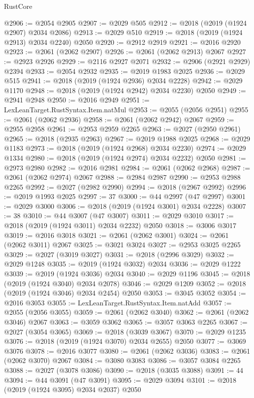 \begin{lexlean}{RustCore}
\begin{coremodule}
@2906 := @2054 @2905
@2907 := @2029 @505
@2912 := @2018 (@2019 (@1924 @2907) @2034 @2086)
@2913 := @2029 @510
@2919 := @2018 (@2019 (@1924 @2913) @2034 @2240) @2050
@2920 := @2912 @2919
@2921 := @2016 @2920
@2923 := @2061 (@2062 @2907)
@2926 := @2061 (@2062 @2913) @2067
@2927 := @2923 @2926
@2929 := @2116 @2927 @2071
@2932 := @2906 (@2921 @2929) @2394
@2933 := @2054 @2932
@2935 := @2019 @1983 @2025
@2936 := @2029 @515
@2941 := @2018 (@2019 (@1924 @2936) @2034 @2228)
@2942 := @2029 @1170
@2948 := @2018 (@2019 (@1924 @2942) @2034 @2230) @2050
@2949 := @2941 @2948
@2950 := @2016 @2949
@2951 := LexLeanTarget.RustSyntax.Item.natMul
@2953 := @2055 (@2056 @2951)
@2955 := @2061 (@2062 @2936)
@2958 := @2061 (@2062 @2942) @2067
@2959 := @2955 @2958
@2961 := @2953 @2959 @2265
@2963 := @2027 (@2950 @2961)
@2965 := @2018 (@2935 @2963)
@2967 := @2019 @1988 @2025
@2968 := @2029 @1183
@2973 := @2018 (@2019 (@1924 @2968) @2034 @2230)
@2974 := @2029 @1334
@2980 := @2018 (@2019 (@1924 @2974) @2034 @2232) @2050
@2981 := @2973 @2980
@2982 := @2016 @2981
@2984 := @2061 (@2062 @2968)
@2987 := @2061 (@2062 @2974) @2067
@2988 := @2984 @2987
@2990 := @2953 @2988 @2265
@2992 := @2027 (@2982 @2990)
@2994 := @2018 (@2967 @2992)
@2996 := @2019 @1993 @2025
@2997 := 37
@3000 := @44 @2997 (@47 @2997)
@3001 := @2029 @3000
@3006 := @2018 (@2019 (@1924 @3001) @2034 @2228)
@3007 := 38
@3010 := @44 @3007 (@47 @3007)
@3011 := @2029 @3010
@3017 := @2018 (@2019 (@1924 @3011) @2034 @2232) @2050
@3018 := @3006 @3017
@3019 := @2016 @3018
@3021 := @2061 (@2062 @3001)
@3024 := @2061 (@2062 @3011) @2067
@3025 := @3021 @3024
@3027 := @2953 @3025 @2265
@3029 := @2027 (@3019 @3027)
@3031 := @2018 (@2996 @3029)
@3032 := @2029 @1248
@3035 := @2019 (@1924 @3032) @2034
@3036 := @2029 @1222
@3039 := @2019 (@1924 @3036) @2034
@3040 := @2029 @1196
@3045 := @2018 (@2019 (@1924 @3040) @2034 @2078)
@3046 := @2029 @1209
@3052 := @2018 (@2019 (@1924 @3046) @2034 @2454) @2050
@3053 := @3045 @3052
@3054 := @2016 @3053
@3055 := LexLeanTarget.RustSyntax.Item.natAdd
@3057 := @2055 (@2056 @3055)
@3059 := @2061 (@2062 @3040)
@3062 := @2061 (@2062 @3046) @2067
@3063 := @3059 @3062
@3065 := @3057 @3063 @2265
@3067 := @2027 (@3054 @3065)
@3069 := @2018 (@3039 @3067)
@3070 := @2029 @1235
@3076 := @2018 (@2019 (@1924 @3070) @2034 @2655) @2050
@3077 := @3069 @3076
@3078 := @2016 @3077
@3080 := @2061 (@2062 @3036)
@3083 := @2061 (@2062 @3070) @2067
@3084 := @3080 @3083
@3086 := @3057 @3084 @2265
@3088 := @2027 (@3078 @3086)
@3090 := @2018 (@3035 @3088)
@3091 := 44
@3094 := @44 @3091 (@47 @3091)
@3095 := @2029 @3094
@3101 := @2018 (@2019 (@1924 @3095) @2034 @2037) @2050

\end{coremodule}
\end{lexlean}
